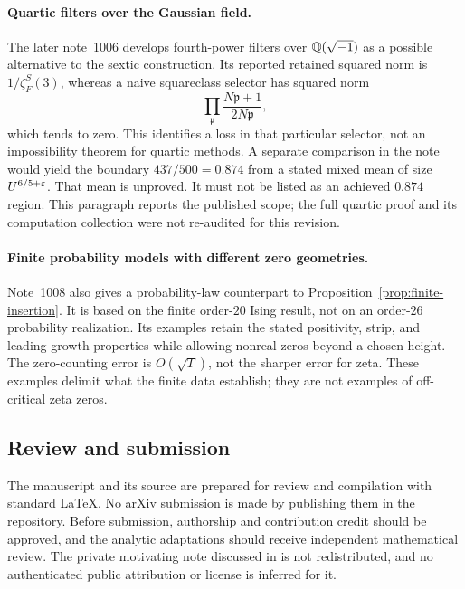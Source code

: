 \paragraph{Quartic filters over the Gaussian field.}
The later note~1006 \cite{R1006} develops fourth-power filters over $\mathbb Q(\sqrt{-1})$ as a possible alternative to the sextic construction. Its reported retained squared norm is $1/\zeta_F^S(3)$, whereas a naive squareclass selector has squared norm
\[
 \prod_{\mathfrak p}\frac{N\mathfrak p+1}{2N\mathfrak p},
\]
which tends to zero. This identifies a loss in that particular selector, not an impossibility theorem for quartic methods. A separate comparison in the note would yield the boundary $437/500=0.874$ from a stated mixed mean of size $U^{6/5+\varepsilon}$. That mean is unproved. It must not be listed as an achieved $0.874$ region. This paragraph reports the published scope; the full quartic proof and its computation collection were not re-audited for this revision.

\paragraph{Finite probability models with different zero geometries.}
Note~1008 \cite{R1008} also gives a probability-law counterpart to Proposition~\ref{prop:finite-insertion}. It is based on the finite order-$20$ Ising result, not on an order-$26$ probability realization. Its examples retain the stated positivity, strip, and leading growth properties while allowing nonreal zeros beyond a chosen height. The zero-counting error is $O(\sqrt T)$, not the sharper error for zeta. These examples delimit what the finite data establish; they are not examples of off-critical zeta zeros.

\subsection{Review and submission}
The manuscript and its source are prepared for review and compilation with standard LaTeX. No arXiv submission is made by publishing them in the repository. Before submission, authorship and contribution credit should be approved, and the analytic adaptations should receive independent mathematical review. The private motivating note discussed in \cite{R993} is not redistributed, and no authenticated public attribution or license is inferred for it.
